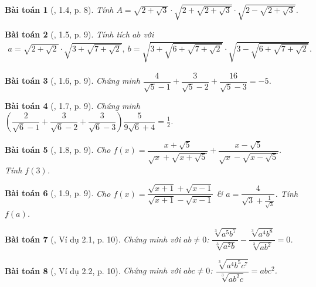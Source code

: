\documentclass{article}
\newtheorem{baitoan}{Bài toán}
\begin{document}
\begin{baitoan}[\cite{TLCT_THCS_Toan_9_dai_so}, 1.4, p. 8]
	Tính $A = \sqrt{2 + \sqrt{3}}\cdot\sqrt{2 + \sqrt{2 + \sqrt{3}}}\cdot\sqrt{2 - \sqrt{2 + \sqrt{3}}}$.
\end{baitoan}

\begin{baitoan}[\cite{TLCT_THCS_Toan_9_dai_so}, 1.5, p. 9]
	Tính tích $ab$ với
	\begin{align*}
		a = \sqrt{2 + \sqrt{2}}\cdot\sqrt{3 + \sqrt{7 + \sqrt{2}}},\ b = \sqrt{3 + \sqrt{6 + \sqrt{7 + \sqrt{2}}}}\cdot\sqrt{3 - \sqrt{6 + \sqrt{7 + \sqrt{2}}}}.
	\end{align*}
\end{baitoan}

\begin{baitoan}[\cite{TLCT_THCS_Toan_9_dai_so}, 1.6, p. 9]
	Chứng minh $\dfrac{4}{\sqrt{5} - 1} + \dfrac{3}{\sqrt{5} - 2} + \dfrac{16}{\sqrt{5} - 3} = -5$.
\end{baitoan}

\begin{baitoan}[\cite{TLCT_THCS_Toan_9_dai_so}, 1.7, p. 9]
	Chứng minh $\left(\dfrac{2}{\sqrt{6} - 1} + \dfrac{3}{\sqrt{6} - 2} + \dfrac{3}{\sqrt{6} - 3}\right)\dfrac{5}{9\sqrt{6} + 4} = \frac{1}{2}$.
\end{baitoan}

\begin{baitoan}[\cite{TLCT_THCS_Toan_9_dai_so}, 1.8, p. 9]
	Cho $f(x) = \dfrac{x + \sqrt{5}}{\sqrt{x} + \sqrt{x + \sqrt{5}}} + \dfrac{x - \sqrt{5}}{\sqrt{x} - \sqrt{x - \sqrt{5}}}$. Tính $f(3)$.
\end{baitoan}

\begin{baitoan}[\cite{TLCT_THCS_Toan_9_dai_so}, 1.9, p. 9]
	Cho $f(x) = \dfrac{\sqrt{x + 1} + \sqrt{x - 1}}{\sqrt{x + 1} - \sqrt{x - 1}}$ \& $a = \dfrac{4}{\sqrt{3} + \frac{1}{\sqrt{3}}}$. Tính $f(a)$.
\end{baitoan}

\begin{baitoan}[\cite{TLCT_THCS_Toan_9_dai_so}, Ví dụ 2.1, p. 10]
	Chứng minh với $ab\ne0$: $\dfrac{\sqrt[3]{a^5b^7}}{\sqrt[3]{a^2b}} - \dfrac{\sqrt[3]{a^4b^8}}{\sqrt[3]{ab^2}} = 0$.
\end{baitoan}

\begin{baitoan}[\cite{TLCT_THCS_Toan_9_dai_so}, Ví dụ 2.2, p. 10]
	Chứng minh với $abc\ne0$: $\dfrac{\sqrt[3]{a^4b^5c^7}}{\sqrt[3]{ab^2c}} = abc^2$.
\end{baitoan}
\end{document}
